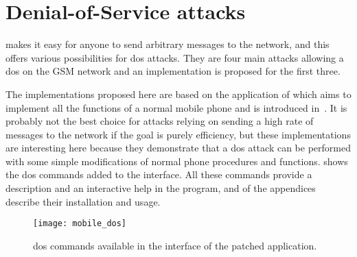 \chapter{Denial-of-Service attacks} \label{chap:dos_attacks}

\iffalse
IN DOS, SHOW THE STATE DIAGRAMS FOR THE THINGS I MODIFIED

Cfr protocol implementation chapter for references. It is in rr/mm/cm.


for imsi detach, check att flag. detach is required for both network,
yet it doesn't work on one of them. Try with tmsi?


!!!!!!!!!!!!!!!!TALK ABOUT HOW IT INFLUENCES GPRS AS WELL!!!!!!!!!!!!!!!!!!

    Insist on the implementation and explanation, this
    is the product. Afak, no other publication explaining all the
    available attacks. insist of implementation with mobile, this is new
    and innovative to exploit normal stuff. try to explain teh method
    and give it a nice name. how i tried to solve the pb and implement
    eth code.

\fi

     makes it easy for anyone to send arbitrary messages
    to the network, and this offers various possibilities for \gls{dos}
    attacks. They are four main attacks allowing a \gls{dos} on the GSM
    network and an implementation is proposed for the first three.

    The implementations proposed here are based on the 
    application of  which aims to implement all the
    functions of a normal mobile phone and is introduced
    in~. It is probably not the
    best choice for attacks relying on sending a high rate of messages
    to the network if the goal is purely efficiency, but these
    implementations are interesting here because they demonstrate that a
    \gls{dos} attack can be performed with some simple modifications of
    normal phone procedures and functions.  shows
    the \gls{dos} commands added to the  interface. All
    these commands provide a description and an interactive help in the
    program, and  of the appendices describe their
    installation and usage.

      \begin{figure}[h]
        \centering
        \texttt{[image: mobile\_dos]}
        \caption{\gls{dos} commands available in the interface of the patched 
        application.}
        \label{fig:mobile_dos}
      \end{figure}

